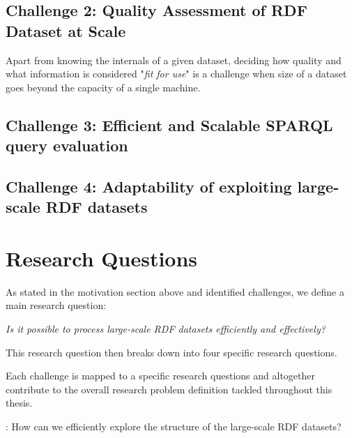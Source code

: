 \subsection{Challenge 2: Quality Assessment of RDF Dataset at Scale}
Apart from knowing the internals of a given dataset, deciding how quality and what information is considered "\textit{fit for use}" is a challenge when size of a dataset goes beyond the capacity of a single machine.

\subsection{Challenge 3: Efficient and Scalable SPARQL query evaluation}


\subsection{Challenge 4: Adaptability of exploiting large-scale RDF datasets}


\section{Research Questions}
\label{sec:research-questions}

As stated in the motivation section above and identified challenges, we define a main research question:

\begin{tcolorbox}
\centering
\textit{Is it possible to process large-scale RDF datasets efficiently and effectively?}
\end{tcolorbox}

This research question then breaks down into four specific research questions.

Each challenge is mapped to a specific research questions and altogether contribute to the overall research problem definition tackled throughout this thesis.

\begin{tcolorbox}
\textbf{\rqNr[RQ1]\label{rq:1}}: How can we efficiently explore the structure of the large-scale RDF datasets?
\end{tcolorbox}

